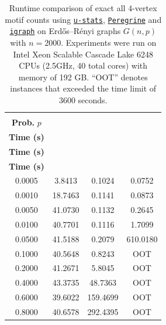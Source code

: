 \documentclass[12pt]{article}
\newcommand{\libref}[2]{\href{#2}{\texttt{#1}}}
\def\package{\libref{u-stats}{https://github.com/zrq1706/U-Statistics-Python}}
\def\igraph{\libref{igraph}{https://igraph.org/}}
\theoremstyle{plain}
\theoremstyle{definition}
\def\package{\libref{u-stats}{https://github.com/zrq1706/U-Statistics-Python}}
\def\igraph{\libref{igraph}{https://igraph.org/}}
\def\peregrine{\libref{Peregrine}{https://github.com/pdclab/peregrine}}
\begin{document}
\begin{bibunit}[agsm]
\begin{table}[h!]
\centering
\caption{
Runtime comparison of exact all $4$-vertex motif counts using \package{}, \peregrine{} and \igraph{} on Erd\H{o}s--R\'enyi graphs $G(n, p)$ with $n = 2000$. 
Experiments were run on Intel Xeon Scalable Cascade Lake 6248 CPUs (2.5GHz, 40 total cores) with memory of 192 GB.
``OOT'' denotes instances that exceeded the time limit of 3600 seconds.
}
\label{tab:motif_counts_4}
\begin{tabular}{cccc}
\toprule
\makecell{\textbf{Edge} \\ \textbf{Prob.} $p$} & \makecell{\textbf{\package{}} \\ \textbf{Time (s)}} & \makecell{\textbf{\peregrine{}} \\ \textbf{Time (s)}} & \makecell{\textbf{\igraph{}} \\ \textbf{Time (s)}} \\
\midrule
0.0005 & 3.8413 & 0.1024 & 0.0752 \\
0.0010 & 18.7463 & 0.1141 & 0.0873 \\
0.0050 & 41.0730 & 0.1132 & 0.2645 \\
0.0100 & 40.7701 & 0.1116 & 1.7099 \\
0.0500 & 41.5188 & 0.2079 & 610.0180 \\
0.1000 & 40.5648 & 0.8243 & OOT \\
0.2000 & 41.2671 & 5.8045 & OOT \\
0.4000 & 43.3735 & 48.7363 & OOT \\
0.6000 & 39.6022 & 159.4699 & OOT \\
0.8000 & 40.6578 & 292.4395 & OOT \\
\bottomrule
\end{tabular}
\end{table}


\end{bibunit}
\end{document}

